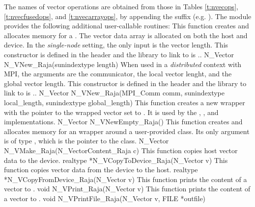The names of vector operations are obtained from those in Tables \ref{t:nvecops},
\ref{t:nvecfusedops}, and \ref{t:nvecarrayops}, by appending the suffix 
(e.g. ).
The module {\nvecraja}  provides the following additional user-callable routines:
{
  This function creates and allocates memory for a {\cuda} .
  The vector data array is allocated on both the host and device.
}
{
  In the \textit{single-node} setting, the only input is the vector length. This
  constructor is defined in the header  and the library to
  link to is ..
}
{
  N\_Vector N\_VNew\_Raja(sunindextype length)
}
{
  When used in a \textit{distributed} context with MPI, the arguments are the
  {\mpi} communicator, the local vector lenght, and the global vector length.
  This constructor is defined in the header  and
  the library to link to is ..
}
{
  N\_Vector N\_VNew\_Raja(MPI\_Comm comm, sunindextype local\_length,
  sunindextype global\_length)
}
{
  This function creates a new {\nvector} wrapper with the pointer to
  the wrapped {\raja} vector set to . It is used by the
  , , and 
  implementations.
}
{
  N\_Vector N\_VNewEmpty\_Raja()
}
{
  This function creates and allocates memory for an {\nvecraja}
  wrapper around a user-provided  class.
  Its only argument is of type \newline
  , which is the pointer to the class.
}
{
  N\_Vector N\_VMake\_Raja(N\_VectorContent\_Raja c)
}
{
 This function copies host vector data to the device.
}
{
 realtype *N\_VCopyToDevice\_Raja(N\_Vector v)
}
{
  This function copies vector data from the device to the host.
}
{
  realtype *N\_VCopyFromDevice\_Raja(N\_Vector v)
}
{
  This function prints the content of a {\raja} vector to .
}
{
  void N\_VPrint\_Raja(N\_Vector v)
}
{
  This function prints the content of a {\raja} vector to .
}
{
  void N\_VPrintFile\_Raja(N\_Vector v, FILE *outfile)
}

